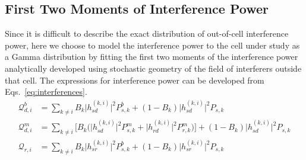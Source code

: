 \subsection{First Two Moments of Interference Power} Since it is difficult to describe the
exact distribution of out-of-cell interference power, here we
choose to model the interference power to the cell under study
as a Gamma distribution by fitting the first two moments of
the interference power analytically developed using stochastic
geometry of the field of interferers outside that cell.
The expressions for interference power can be developed from Eqs.~\ref{eq:interferences}. 
\begin{align}
\mathcal{Q}_{d,i}^b &= \sum_{k\neq i}B_k \Big |h_{sd}^{(k,i)}\Big|^2P_{s,k}^b + (1-B_k)\Big|h_{sd}^{(k,i)}\Big|^2P_{s,k} \\
\mathcal{Q}_{d,i}^m &= \sum_{k\neq i}\bigg[B_k\bigg(\Big|h_{sd}^{(k,i)}\Big|^2 P_{s,k}^m+\Big|h_{rd}^{(k,i)}\Big|^2 P_{r,k}^m\bigg)\bigg] + (1-B_k) \Big| h_{sd}^{(k,i)}\Big|^2 P_{s,k} \\
\mathcal{Q}_{r,i} &= \sum_{k\neq i}B_k \Big|h_{sr}^{(k,i)}\Big|^2P_{s,k}^b + (1-B_k)\Big|h_{sr}^{(k,i)}\Big|^2P_{s,k} 
\end{align}

